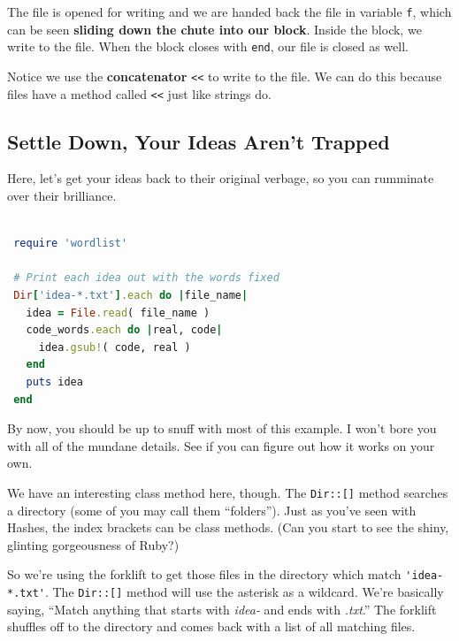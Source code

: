 \documentclass[10pt,twoside]{report}
\begin{document}
The file is opened for writing and we are handed back the file in
variable \lstinline[breaklines=true]|f|, which can be seen {\bf
  sliding down the chute into our block}.  Inside the block, we write
to the file.  When the block closes with
\lstinline[breaklines=true]|end|, our file is closed as well.

Notice we use the {\bf concatenator} \lstinline[breaklines=true]|<<|
to write to the file.  We can do this because files have a method
called \lstinline[breaklines=true]|<<| just like strings do.



\subsection{Settle Down, Your Ideas Aren't Trapped}



Here, let's get your ideas back to their original verbage, so you can
rumminate over their brilliance.


\begin{lstlisting}[basicstyle=\ttfamily\color{basiccolor},
    commentstyle = \ttfamily\color{commentcolor},
    keywordstyle=\ttfamily\color{keywordscolor},
    stringstyle=\color{stringcolor},
    language=Ruby,
    basicstyle=\small\ttfamily,
    showstringspaces=false,
  ]

 require 'wordlist'

 # Print each idea out with the words fixed
 Dir['idea-*.txt'].each do |file_name|
   idea = File.read( file_name )
   code_words.each do |real, code|
     idea.gsub!( code, real )
   end
   puts idea
 end

\end{lstlisting}

By now, you should be up to snuff with most of this example.  I won't
bore you with all of the mundane details.  See if you can figure out
how it works on your own.

We have an interesting class method here, though.  The
\lstinline[breaklines=true]|Dir::[]| method searches a directory (some
of you may call them ``folders'').  Just as you've seen with Hashes,
the index brackets can be class methods.  (Can you start to see the
shiny, glinting gorgeousness of Ruby?)

So we're using the forklift to get those files in the directory which
match \lstinline[breaklines=true]|'idea-*.txt'|.  The
\lstinline[breaklines=true]|Dir::[]| method will use the asterisk as a
wildcard.  We're basically saying, ``Match anything that starts with
{\em idea-} and ends with {\em .txt}.''  The forklift shuffles off to
the directory and comes back with a list of all matching files.
\end{document}
